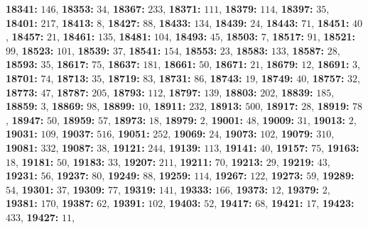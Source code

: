 \textsf{\bfseries 18341:} $146$, \textsf{\bfseries 18353:} $34$, \textsf{\bfseries 18367:} $233$, \textsf{\bfseries 18371:} $111$, \textsf{\bfseries 18379:} $114$, \textsf{\bfseries 18397:} $35$, \textsf{\bfseries 18401:} $217$, \textsf{\bfseries 18413:} $8$, \textsf{\bfseries 18427:} $88$, \textsf{\bfseries 18433:} $134$, \textsf{\bfseries 18439:} $24$, \textsf{\bfseries 18443:} $71$, \textsf{\bfseries 18451:} $40$, \textsf{\bfseries 18457:} $21$, \textsf{\bfseries 18461:} $135$, \textsf{\bfseries 18481:} $104$, \textsf{\bfseries 18493:} $45$, \textsf{\bfseries 18503:} $7$, \textsf{\bfseries 18517:} $91$, \textsf{\bfseries 18521:} $99$, \textsf{\bfseries 18523:} $101$, \textsf{\bfseries 18539:} $37$, \textsf{\bfseries 18541:} $154$, \textsf{\bfseries 18553:} $23$, \textsf{\bfseries 18583:} $133$, \textsf{\bfseries 18587:} $28$, \textsf{\bfseries 18593:} $35$, \textsf{\bfseries 18617:} $75$, \textsf{\bfseries 18637:} $181$, \textsf{\bfseries 18661:} $50$, \textsf{\bfseries 18671:} $21$, \textsf{\bfseries 18679:} $12$, \textsf{\bfseries 18691:} $3$, \textsf{\bfseries 18701:} $74$, \textsf{\bfseries 18713:} $35$, \textsf{\bfseries 18719:} $83$, \textsf{\bfseries 18731:} $86$, \textsf{\bfseries 18743:} $19$, \textsf{\bfseries 18749:} $40$, \textsf{\bfseries 18757:} $32$, \textsf{\bfseries 18773:} $47$, \textsf{\bfseries 18787:} $205$, \textsf{\bfseries 18793:} $112$, \textsf{\bfseries 18797:} $139$, \textsf{\bfseries 18803:} $202$, \textsf{\bfseries 18839:} $185$, \textsf{\bfseries 18859:} $3$, \textsf{\bfseries 18869:} $98$, \textsf{\bfseries 18899:} $10$, \textsf{\bfseries 18911:} $232$, \textsf{\bfseries 18913:} $500$, \textsf{\bfseries 18917:} $28$, \textsf{\bfseries 18919:} $78$, \textsf{\bfseries 18947:} $50$, \textsf{\bfseries 18959:} $57$, \textsf{\bfseries 18973:} $18$, \textsf{\bfseries 18979:} $2$, \textsf{\bfseries 19001:} $48$, \textsf{\bfseries 19009:} $31$, \textsf{\bfseries 19013:} $2$, \textsf{\bfseries 19031:} $109$, \textsf{\bfseries 19037:} $516$, \textsf{\bfseries 19051:} $252$, \textsf{\bfseries 19069:} $24$, \textsf{\bfseries 19073:} $102$, \textsf{\bfseries 19079:} $310$, \textsf{\bfseries 19081:} $332$, \textsf{\bfseries 19087:} $38$, \textsf{\bfseries 19121:} $244$, \textsf{\bfseries 19139:} $113$, \textsf{\bfseries 19141:} $40$, \textsf{\bfseries 19157:} $75$, \textsf{\bfseries 19163:} $18$, \textsf{\bfseries 19181:} $50$, \textsf{\bfseries 19183:} $33$, \textsf{\bfseries 19207:} $211$, \textsf{\bfseries 19211:} $70$, \textsf{\bfseries 19213:} $29$, \textsf{\bfseries 19219:} $43$, \textsf{\bfseries 19231:} $56$, \textsf{\bfseries 19237:} $80$, \textsf{\bfseries 19249:} $88$, \textsf{\bfseries 19259:} $114$, \textsf{\bfseries 19267:} $122$, \textsf{\bfseries 19273:} $59$, \textsf{\bfseries 19289:} $54$, \textsf{\bfseries 19301:} $37$, \textsf{\bfseries 19309:} $77$, \textsf{\bfseries 19319:} $141$, \textsf{\bfseries 19333:} $166$, \textsf{\bfseries 19373:} $12$, \textsf{\bfseries 19379:} $2$, \textsf{\bfseries 19381:} $170$, \textsf{\bfseries 19387:} $62$, \textsf{\bfseries 19391:} $102$, \textsf{\bfseries 19403:} $52$, \textsf{\bfseries 19417:} $68$, \textsf{\bfseries 19421:} $17$, \textsf{\bfseries 19423:} $433$, \textsf{\bfseries 19427:} $11$, 

